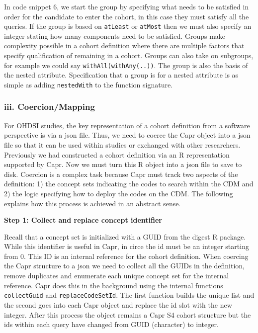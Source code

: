 \documentclass[
]{article}
\begin{document}
In code snippet 6, we start the group by specifying what needs to be
satisfied in order for the candidate to enter the cohort, in this case
they must satisfy all the queries. If the group is based on
\texttt{atLeast} or \texttt{atMost} then we must also specify an integer
stating how many components need to be satisfied. Groups make complexity
possible in a cohort definition where there are multiple factors that
specify qualification of remaining in a cohort. Groups can also take on
subgroups, for example we could say \texttt{withAll(withAny(..))}. The
group is also the basis of the nested attribute. Specification that a
group is for a nested attribute is as simple as adding
\texttt{nestedWith} to the function signature.

\subsubsection{iii. Coercion/Mapping}\label{iii.-coercionmapping}

For OHDSI studies, the key representation of a cohort definition from a
software perspective is via a json file. Thus, we need to coerce the
Capr object into a json file so that it can be used within studies or
exchanged with other researchers. Previously we had constructed a cohort
definition via an R representation supported by Capr. Now we must turn
this R object into a json file to save to disk. Coercion is a complex
task because Capr must track two aspects of the definition: 1) the
concept sets indicating the codes to search within the CDM and 2) the
logic specifying how to deploy the codes on the CDM. The following
explains how this process is achieved in an abstract sense.

\textbf{Step 1: Collect and replace concept identifier}

Recall that a concept set is initialized with a GUID from the digest R
package. While this identifier is useful in Capr, in circe the id must
be an integer starting from 0. This ID is an internal reference for the
cohort definition. When coercing the Capr structure to a json we need to
collect all the GUIDs in the definition, remove duplicates and enumerate
each unique concept set for the internal reference. Capr does this in
the background using the internal functions \texttt{collectGuid} and
\texttt{replaceCodeSetId}. The first function builds the unique list and
the second goes into each Capr object and replace the id slot with the
new integer. After this process the object remains a Capr S4 cohort
structure but the ids within each query have changed from GUID
(character) to integer.
\end{document}
